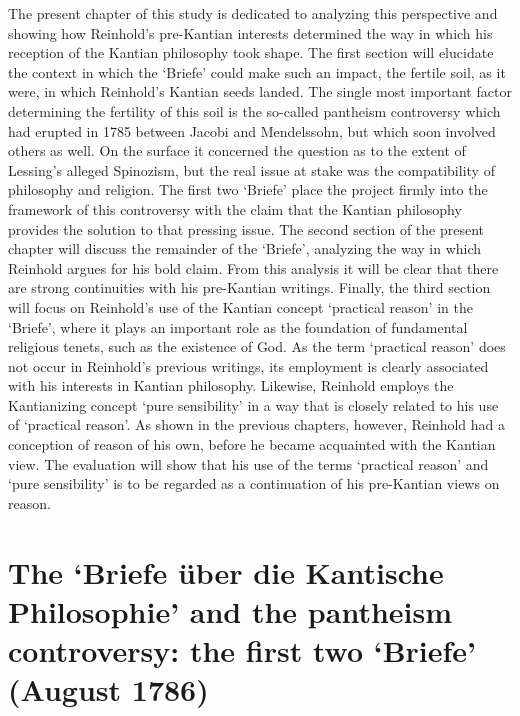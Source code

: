  The present chapter of this study is dedicated to analyzing this perspective and showing how Reinhold's pre{-}Kantian interests determined the way in which his reception of the Kantian philosophy took shape. The first section will elucidate the context in which the `Briefe' could make such an impact, the fertile soil, as it were, in which Reinhold's Kantian seeds landed. The single most important factor determining the fertility of this soil is the so{-}called pantheism controversy which had erupted in 1785 between Jacobi and Mendelssohn, but which soon involved others as well. On the surface it concerned the question as to the extent of Lessing's alleged Spinozism, but the real issue at stake was the compatibility of philosophy and religion. The first two `Briefe' place the project firmly into the framework of this controversy with the claim that the Kantian philosophy provides the solution to that pressing issue. The second section of the present chapter will discuss the remainder of the `Briefe', analyzing the way in which Reinhold argues for his bold claim. From this analysis it will be clear that there are strong continuities with his pre{-}Kantian writings. Finally, the third section will focus on Reinhold's use of the Kantian concept `practical reason' in the `Briefe', where it plays an important role as the foundation of fundamental religious tenets, such as the existence of God. As the term `practical reason' does not occur in Reinhold's previous writings, its employment is clearly associated with his interests in Kantian philosophy. Likewise, Reinhold employs the Kantianizing concept `pure sensibility' in a way that is closely related to his use of `practical reason'. As shown in the previous chapters, however, Reinhold had a conception of reason of his own, before he became acquainted with the Kantian view. The evaluation will show that his use of the terms `practical reason' and `pure sensibility' is to be regarded as a continuation of his pre{-}Kantian views on reason. 


\section{The `Briefe \"{u}ber die Kantische Philosophie' and the pantheism controversy: the first two `Briefe' (August 1786)}


